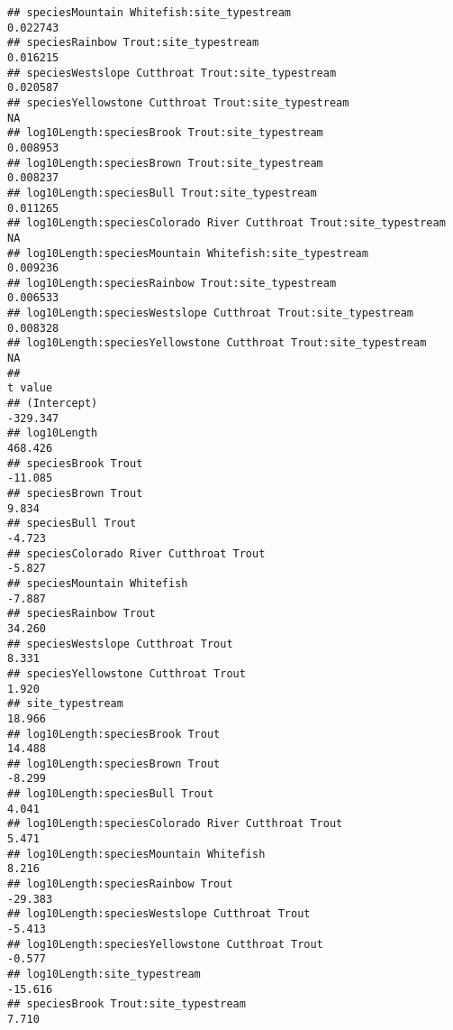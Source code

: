 \documentclass[
  landscape]{article}
\begin{document}
\begin{verbatim}
## speciesMountain Whitefish:site_typestream                           0.022743
## speciesRainbow Trout:site_typestream                                0.016215
## speciesWestslope Cutthroat Trout:site_typestream                    0.020587
## speciesYellowstone Cutthroat Trout:site_typestream                        NA
## log10Length:speciesBrook Trout:site_typestream                      0.008953
## log10Length:speciesBrown Trout:site_typestream                      0.008237
## log10Length:speciesBull Trout:site_typestream                       0.011265
## log10Length:speciesColorado River Cutthroat Trout:site_typestream         NA
## log10Length:speciesMountain Whitefish:site_typestream               0.009236
## log10Length:speciesRainbow Trout:site_typestream                    0.006533
## log10Length:speciesWestslope Cutthroat Trout:site_typestream        0.008328
## log10Length:speciesYellowstone Cutthroat Trout:site_typestream            NA
##                                                                    t value
## (Intercept)                                                       -329.347
## log10Length                                                        468.426
## speciesBrook Trout                                                 -11.085
## speciesBrown Trout                                                   9.834
## speciesBull Trout                                                   -4.723
## speciesColorado River Cutthroat Trout                               -5.827
## speciesMountain Whitefish                                           -7.887
## speciesRainbow Trout                                                34.260
## speciesWestslope Cutthroat Trout                                     8.331
## speciesYellowstone Cutthroat Trout                                   1.920
## site_typestream                                                     18.966
## log10Length:speciesBrook Trout                                      14.488
## log10Length:speciesBrown Trout                                      -8.299
## log10Length:speciesBull Trout                                        4.041
## log10Length:speciesColorado River Cutthroat Trout                    5.471
## log10Length:speciesMountain Whitefish                                8.216
## log10Length:speciesRainbow Trout                                   -29.383
## log10Length:speciesWestslope Cutthroat Trout                        -5.413
## log10Length:speciesYellowstone Cutthroat Trout                      -0.577
## log10Length:site_typestream                                        -15.616
## speciesBrook Trout:site_typestream                                   7.710

\end{verbatim}
\end{document}
